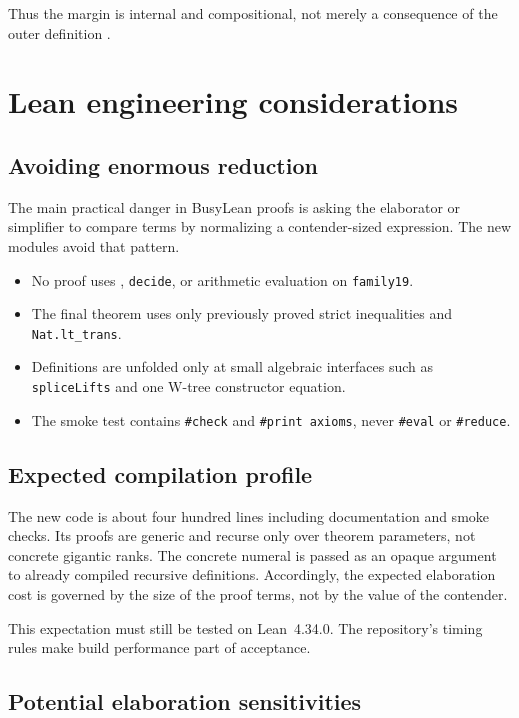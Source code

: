 \documentclass[11pt]{article}
\theoremstyle{definition}
\theoremstyle{remark}
\newcommand{\lean}[1]{\nolinkurl{#1}}
\newcommand{\leancode}[1]{\texttt{\detokenize{#1}}}
\begin{document}
Thus the margin is internal and compositional, not merely a consequence of the
outer definition \leancode{F20 (F20 42)}.

\section{Lean engineering considerations}

\subsection{Avoiding enormous reduction}

The main practical danger in BusyLean proofs is asking the elaborator or
simplifier to compare terms by normalizing a contender-sized expression. The
new modules avoid that pattern.

\begin{itemize}[leftmargin=*]
\item No proof uses \leancode{simp [F20]}, \lean{decide}, or arithmetic evaluation
  on \lean{family19}.
\item The final theorem uses only previously proved strict inequalities and
  \lean{Nat.lt_trans}.
\item Definitions are unfolded only at small algebraic interfaces such as
  \lean{spliceLifts} and one W-tree constructor equation.
\item The smoke test contains \texttt{\#check} and \texttt{\#print axioms}, never
  \texttt{\#eval} or \texttt{\#reduce}.
\end{itemize}

\subsection{Expected compilation profile}

The new code is about four hundred lines including documentation and smoke
checks. Its proofs are generic and recurse only over theorem parameters, not
concrete gigantic ranks. The concrete numeral \leancode{rank20 n} is passed as an
opaque argument to already compiled recursive definitions. Accordingly, the
expected elaboration cost is governed by the size of the proof terms, not by
the value of the contender.

This expectation must still be tested on Lean~4.34.0. The repository's timing
rules make build performance part of acceptance.

\subsection{Potential elaboration sensitivities}
\end{document}
